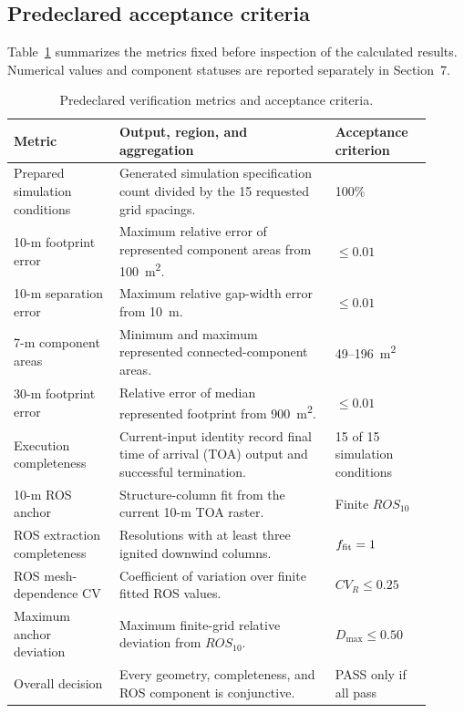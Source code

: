 \subsection{Predeclared acceptance criteria}

Table~\ref{tab:acceptance-contract} summarizes the metrics fixed before
inspection of the calculated results. Numerical values and component statuses
are reported separately in Section~7.

\begin{table}[H]
\centering
\footnotesize
\caption{Predeclared verification metrics and acceptance criteria.}
\label{tab:acceptance-contract}
\begin{tabular}{@{}p{0.23\linewidth}p{0.47\linewidth}p{0.21\linewidth}@{}}
\toprule
Metric & Output, region, and aggregation & Acceptance criterion\\
\midrule
Prepared simulation conditions & Generated simulation specification count divided by the 15 requested grid spacings. & 100\% \\
10-m footprint error & Maximum relative error of represented component areas from \SI{100}{m^2}. & \(\le0.01\) \\
10-m separation error & Maximum relative gap-width error from \SI{10}{m}. & \(\le0.01\) \\
7-m component areas & Minimum and maximum represented connected-component areas. & 49--\SI{196}{m^2} \\
30-m footprint error & Relative error of median represented footprint from \SI{900}{m^2}. & \(\le0.01\) \\
Execution completeness & Current-input identity record final time of arrival (TOA) output and successful termination. & 15 of 15 simulation conditions \\
10-m ROS anchor & Structure-column fit from the current 10-m TOA raster. & Finite \(ROS_{10}\) \\
ROS extraction completeness & Resolutions with at least three ignited downwind columns. & \(f_{\rm fit}=1\) \\
ROS mesh-dependence CV & Coefficient of variation over finite fitted ROS values. & \(CV_R\le0.25\) \\
Maximum anchor deviation & Maximum finite-grid relative deviation from \(ROS_{10}\). & \(D_{\max}\le0.50\) \\
Overall decision & Every geometry, completeness, and ROS component is conjunctive. & PASS only if all pass \\
\bottomrule
\end{tabular}
\end{table}

